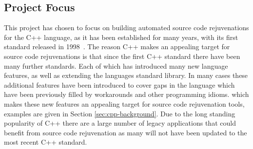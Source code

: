 \documentclass[bsc,frontabs,singlespacing,twoside,parskip,deptreport]{infthesis}
\begin{document}
\subsection{Project Focus}

This project has chosen to focus on building automated source code rejuvenations for the C++ language, as it has been established for many years, with its first standard released in 1998~\cite{ISO:1998:IIP}. The reason C++ makes an appealing target for source code rejuvenations is that since the first C++ standard there have been many further standards. Each of which has introduced many new language features, as well as extending the languages standard library. In many cases these additional features have been introduced to cover gaps in the language which have been previously filled by workarounds and other programming idioms. which makes these new features an appealing target for source code rejuvenation tools, examples are given in Section \ref{sec:cpp-background}. Due to the long standing popularity of C++ there are a large number of legacy applications that could benefit from source code rejuvenation as many will not have been updated to the most recent C++ standard.

% 






    

\end{document}
